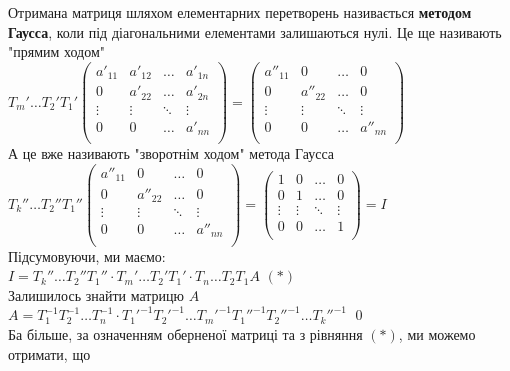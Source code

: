 \documentclass[a4paper, 10pt]{article}
\theoremstyle{theoremdd}
\begin{document}
	Отримана матриця шляхом елементарних перетворень називається \textbf{методом Гаусса}, коли під діагональними елементами залишаються нулі. Це ще називають "прямим ходом"\\
	$T_m' \dots T_2' T_1' \begin{pmatrix}
	a'_{11} & a'_{12} & \dots & a'_{1n} \\
	0 & a'_{22} & \dots & a'_{2n} \\
	\vdots & \vdots & \ddots & \vdots \\
	0 & 0 & \dots & a'_{nn} \\
	\end{pmatrix} = \begin{pmatrix}
	a''_{11} & 0 & \dots & 0 \\
	0 & a''_{22} & \dots & 0 \\
	\vdots & \vdots & \ddots & \vdots \\
	0 & 0 & \dots & a''_{nn} \\
	\end{pmatrix}$\\
	А це вже називають "зворотнім ходом" \textrm{} метода Гаусса\\
	$T_k''\dots T_2'' T_1'' \begin{pmatrix}
	a''_{11} & 0 & \dots & 0 \\
	0 & a''_{22} & \dots & 0 \\
	\vdots & \vdots & \ddots & \vdots \\
	0 & 0 & \dots & a''_{nn} \\
	\end{pmatrix} = \begin{pmatrix}
	1 & 0 & \dots & 0 \\
	0 & 1 & \dots & 0 \\
	\vdots & \vdots & \ddots & \vdots \\
	0 & 0 & \dots & 1 \\
	\end{pmatrix} = I$\\
	Підсумовуючи, ми маємо:\\
	$I = T_k'' \dots T_2'' T_1'' \cdot T_m' \dots T_2' T_1' \cdot T_n \dots T_2 T_1 A$ $(*)$\\
	Залишилось знайти матрицю $A$\\
	$A = T_1^{-1} T_2^{-1} \dots T_n^{-1} \cdot T_1'^{-1} T_2'^{-1} \dots T_m'^{-1} T_1''^{-1} T_2''^{-1} \dots T_k''^{-1}$
	\qed
	\bigskip \\
	Ба більше, за означенням оберненої матриці та з рівняння $(*)$, ми можемо отримати, що\\
\end{document}
